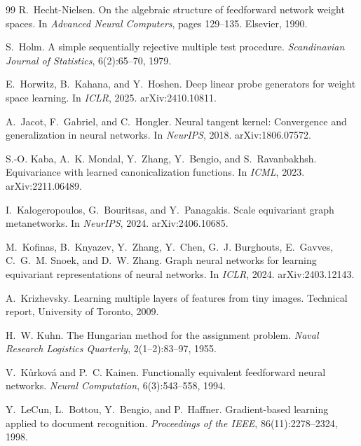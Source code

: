 \documentclass[10pt,letterpaper]{article}
\theoremstyle{definition}
\begin{document}
\begin{thebibliography}{99}
R.~Hecht-Nielsen.
\newblock On the algebraic structure of feedforward network weight spaces.
\newblock In \emph{Advanced Neural Computers}, pages 129--135. Elsevier, 1990.

S.~Holm.
\newblock A simple sequentially rejective multiple test procedure.
\newblock \emph{Scandinavian Journal of Statistics}, 6(2):65--70, 1979.

E.~Horwitz, B.~Kahana, and Y.~Hoshen.
\newblock Deep linear probe generators for weight space learning.
\newblock In \emph{ICLR}, 2025. arXiv:2410.10811.

A.~Jacot, F.~Gabriel, and C.~Hongler.
\newblock Neural tangent kernel: Convergence and generalization in neural networks.
\newblock In \emph{NeurIPS}, 2018. arXiv:1806.07572.

S.-O. Kaba, A.~K. Mondal, Y.~Zhang, Y.~Bengio, and S.~Ravanbakhsh.
\newblock Equivariance with learned canonicalization functions.
\newblock In \emph{ICML}, 2023. arXiv:2211.06489.

I.~Kalogeropoulos, G.~Bouritsas, and Y.~Panagakis.
\newblock Scale equivariant graph metanetworks.
\newblock In \emph{NeurIPS}, 2024. arXiv:2406.10685.

M.~Kofinas, B.~Knyazev, Y.~Zhang, Y.~Chen, G.~J. Burghouts, E.~Gavves, C.~G.~M. Snoek, and
D.~W. Zhang.
\newblock Graph neural networks for learning equivariant representations of neural networks.
\newblock In \emph{ICLR}, 2024. arXiv:2403.12143.

A.~Krizhevsky.
\newblock Learning multiple layers of features from tiny images.
\newblock Technical report, University of Toronto, 2009.

H.~W. Kuhn.
\newblock The Hungarian method for the assignment problem.
\newblock \emph{Naval Research Logistics Quarterly}, 2(1--2):83--97, 1955.

V.~K\r{u}rkov\'a and P.~C. Kainen.
\newblock Functionally equivalent feedforward neural networks.
\newblock \emph{Neural Computation}, 6(3):543--558, 1994.

Y.~LeCun, L.~Bottou, Y.~Bengio, and P.~Haffner.
\newblock Gradient-based learning applied to document recognition.
\newblock \emph{Proceedings of the IEEE}, 86(11):2278--2324, 1998.


\end{thebibliography}
\end{document}
